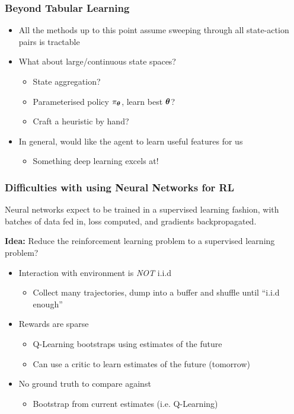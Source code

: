 \begin{frame}
	\frametitle{Beyond Tabular Learning}
	
\begin{itemize}
	\item All the methods up to this point assume sweeping through 
	all state-action pairs is tractable
	\pause
	\item What about large/continuous state spaces?
	\begin{itemize}
		\item State aggregation?
		\item Parameterised policy $\pi_{\boldsymbol{\theta}}$, learn best ${\boldsymbol{\theta}}$?
		\item Craft a heuristic by hand?
	\end{itemize}
	\item In general, would like the agent to learn useful features for us
	\pause
	\begin{itemize}
		\item Something deep learning excels at!
	\end{itemize}
\end{itemize}
\end{frame}


\begin{frame}
	\frametitle{Difficulties with using Neural Networks for RL}
	
	
		Neural networks expect to be trained in a supervised learning fashion,
		with batches of data fed in, loss computed, and gradients backpropagated.  
	
	
	\textbf{Idea:} Reduce the reinforcement learning problem
	to a supervised learning problem?
		\pause
		\begin{itemize}
		\item Interaction with environment is \textit{NOT} i.i.d
		\begin{itemize}
			\pause
			\item Collect many trajectories, dump into a buffer and shuffle until ``i.i.d enough''
		\end{itemize}
		\pause
		\item Rewards are sparse
		\begin{itemize}
			\pause
			\item Q-Learning bootstraps using estimates of the future
			\item Can use a critic to learn estimates of the future (tomorrow)
		\end{itemize}
		\pause
		\item No ground truth to compare against
		\begin{itemize}
			\pause
			\item Bootstrap from current estimates (i.e. Q-Learning)
		\end{itemize}
	\end{itemize}
\end{frame}



